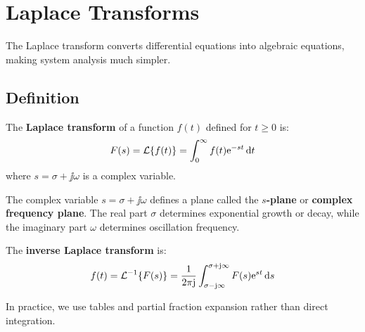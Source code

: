\chapter{Laplace Transforms}
\label{ch:laplace}

The Laplace transform converts differential equations into algebraic equations, making system analysis much simpler.

\section{Definition}

\begin{definitionbox}[title=Definition 0.2: Laplace Transform]
The \textbf{Laplace transform} of a function $f(t)$ defined for $t \geq 0$ is:
\begin{equation}
F(s) = \mathcal{L}\{f(t)\} = \int_0^\infty f(t)\mathrm{e}^{-st} \, \mathrm{d} t
\end{equation}
where $s = \sigma + \jj\omega$ is a complex variable.
\end{definitionbox}

The complex variable $s = \sigma + \jj\omega$ defines a plane called the \textbf{$s$-plane} or \textbf{complex frequency plane}. The real part $\sigma$ determines exponential growth or decay, while the imaginary part $\omega$ determines oscillation frequency.



The \textbf{inverse Laplace transform} is:
\begin{equation}
f(t) = \mathcal{L}^{-1}\{F(s)\} = \frac{1}{2\pi\mathrm{j}} \int_{\sigma-\mathrm{j}\infty}^{\sigma+\mathrm{j}\infty} F(s)\mathrm{e}^{st} \, \mathrm{d} s
\end{equation}

In practice, we use tables and partial fraction expansion rather than direct integration.

